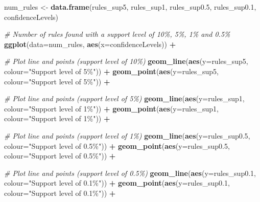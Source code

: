 \documentclass[
]{article}
\newenvironment{Shaded}{\begin{snugshade}}{\end{snugshade}}
\newcommand{\AttributeTok}[1]{\textcolor[rgb]{0.13,0.29,0.53}{#1}}
\newcommand{\CommentTok}[1]{\textcolor[rgb]{0.56,0.35,0.01}{\textit{#1}}}
\newcommand{\FloatTok}[1]{\textcolor[rgb]{0.00,0.00,0.81}{#1}}
\newcommand{\FunctionTok}[1]{\textcolor[rgb]{0.13,0.29,0.53}{\textbf{#1}}}
\newcommand{\NormalTok}[1]{#1}
\newcommand{\OtherTok}[1]{\textcolor[rgb]{0.56,0.35,0.01}{#1}}
\newcommand{\SpecialCharTok}[1]{\textcolor[rgb]{0.81,0.36,0.00}{\textbf{#1}}}
\newcommand{\StringTok}[1]{\textcolor[rgb]{0.31,0.60,0.02}{#1}}
\begin{document}
\begin{Shaded}
\begin{Highlighting}[]
\NormalTok{num\_rules }\OtherTok{\textless{}{-}} \FunctionTok{data.frame}\NormalTok{(rules\_sup5, rules\_sup1, rules\_sup0}\FloatTok{.5}\NormalTok{, rules\_sup0}\FloatTok{.1}\NormalTok{, confidenceLevels)}

\CommentTok{\# Number of rules found with a support level of 10\%, 5\%, 1\% and 0.5\%}
\FunctionTok{ggplot}\NormalTok{(}\AttributeTok{data=}\NormalTok{num\_rules, }\FunctionTok{aes}\NormalTok{(}\AttributeTok{x=}\NormalTok{confidenceLevels)) }\SpecialCharTok{+}
  
  \CommentTok{\# Plot line and points (support level of 10\%)}
  \FunctionTok{geom\_line}\NormalTok{(}\FunctionTok{aes}\NormalTok{(}\AttributeTok{y=}\NormalTok{rules\_sup5, }\AttributeTok{colour=}\StringTok{"Support level of 5\%"}\NormalTok{)) }\SpecialCharTok{+} 
  \FunctionTok{geom\_point}\NormalTok{(}\FunctionTok{aes}\NormalTok{(}\AttributeTok{y=}\NormalTok{rules\_sup5, }\AttributeTok{colour=}\StringTok{"Support level of 5\%"}\NormalTok{)) }\SpecialCharTok{+}
  
  \CommentTok{\# Plot line and points (support level of 5\%)}
  \FunctionTok{geom\_line}\NormalTok{(}\FunctionTok{aes}\NormalTok{(}\AttributeTok{y=}\NormalTok{rules\_sup1, }\AttributeTok{colour=}\StringTok{"Support level of 1\%"}\NormalTok{)) }\SpecialCharTok{+}
  \FunctionTok{geom\_point}\NormalTok{(}\FunctionTok{aes}\NormalTok{(}\AttributeTok{y=}\NormalTok{rules\_sup1, }\AttributeTok{colour=}\StringTok{"Support level of 1\%"}\NormalTok{)) }\SpecialCharTok{+}
  
  \CommentTok{\# Plot line and points (support level of 1\%)}
  \FunctionTok{geom\_line}\NormalTok{(}\FunctionTok{aes}\NormalTok{(}\AttributeTok{y=}\NormalTok{rules\_sup0}\FloatTok{.5}\NormalTok{, }\AttributeTok{colour=}\StringTok{"Support level of 0.5\%"}\NormalTok{)) }\SpecialCharTok{+} 
  \FunctionTok{geom\_point}\NormalTok{(}\FunctionTok{aes}\NormalTok{(}\AttributeTok{y=}\NormalTok{rules\_sup0}\FloatTok{.5}\NormalTok{, }\AttributeTok{colour=}\StringTok{"Support level of 0.5\%"}\NormalTok{)) }\SpecialCharTok{+}
  
  \CommentTok{\# Plot line and points (support level of 0.5\%)}
  \FunctionTok{geom\_line}\NormalTok{(}\FunctionTok{aes}\NormalTok{(}\AttributeTok{y=}\NormalTok{rules\_sup0}\FloatTok{.1}\NormalTok{, }\AttributeTok{colour=}\StringTok{"Support level of 0.1\%"}\NormalTok{)) }\SpecialCharTok{+}
  \FunctionTok{geom\_point}\NormalTok{(}\FunctionTok{aes}\NormalTok{(}\AttributeTok{y=}\NormalTok{rules\_sup0}\FloatTok{.1}\NormalTok{, }\AttributeTok{colour=}\StringTok{"Support level of 0.1\%"}\NormalTok{)) }\SpecialCharTok{+}
  

\end{Highlighting}
\end{Shaded}
\end{document}
